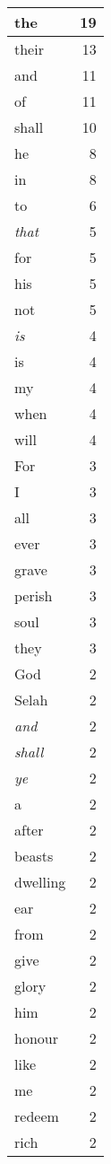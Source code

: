 \begin{center}
\begin{longtable}{l|r}
\hline \hline
\endlastfoot
the & 19 \\ \hline
their & 13 \\ \hline
and & 11 \\ \hline
of & 11 \\ \hline
shall & 10 \\ \hline
he & 8 \\ \hline
in & 8 \\ \hline
to & 6 \\ \hline
\emph{that} & 5 \\ \hline
for & 5 \\ \hline
his & 5 \\ \hline
not & 5 \\ \hline
\emph{is} & 4 \\ \hline
is & 4 \\ \hline
my & 4 \\ \hline
when & 4 \\ \hline
will & 4 \\ \hline
For & 3 \\ \hline
I & 3 \\ \hline
all & 3 \\ \hline
ever & 3 \\ \hline
grave & 3 \\ \hline
perish & 3 \\ \hline
soul & 3 \\ \hline
they & 3 \\ \hline
God & 2 \\ \hline
Selah & 2 \\ \hline
\emph{and} & 2 \\ \hline
\emph{shall} & 2 \\ \hline
\emph{ye} & 2 \\ \hline
a & 2 \\ \hline
after & 2 \\ \hline
beasts & 2 \\ \hline
dwelling & 2 \\ \hline
ear & 2 \\ \hline
from & 2 \\ \hline
give & 2 \\ \hline
glory & 2 \\ \hline
him & 2 \\ \hline
honour & 2 \\ \hline
like & 2 \\ \hline
me & 2 \\ \hline
redeem & 2 \\ \hline
rich & 2 \\ \hline

\end{longtable}
\end{center}
